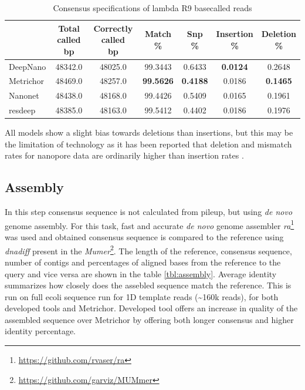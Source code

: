 \documentclass[times, utf8, diplomski, numeric, english]{fer}
\begin{document}
\begin{table}[htb]
	\caption{Consensus specifications of lambda R9 basecalled reads}
	\label{tbl:spec_lambda}
	\centering
	
	\begin{tabular}{lcccccc}
		\toprule
		{} &  \thead{Total called\\\lbrack bp\rbrack} &  \thead{Correctly called\\\lbrack bp\rbrack} &  \thead{Match\\\%} &  \thead{Snp\\\%} &  \thead{Insertion\\\%} &  \thead{Deletion\\\%} \\
		\midrule
		DeepNano  &                    48342.0 &                        48025.0 &          99.3443 &         0.6433 &               \textbf{0.0124} &              0.2648 \\
		Metrichor &                    48469.0 &                        48257.0 &          \textbf{99.5626} &         \textbf{0.4188} &               0.0186 &              \textbf{0.1465} \\
		Nanonet   &                    48438.0 &                        48168.0 &          99.4426 &         0.5409 &               0.0165 &              0.1961 \\
		resdeep   &                    48385.0 &                        48163.0 &          99.5412 &         0.4402 &               0.0186 &              0.1976 \\
		\bottomrule
	\end{tabular}
\end{table}

All models show a slight bias towards deletions than insertions, but this may be the limitation of technology as it has been reported that deletion and mismatch rates for nanopore data are ordinarily higher than insertion rates \cite{sovic}.

\subsection{Assembly}
In this step consensus sequence is not calculated from pileup, but using \textit{de novo} genome assembly. For this task, fast and accurate \textit{de novo} genome assembler \textit{ra}\footnote{\url{https://github.com/rvaser/ra}} \cite{vaser} was used and obtained consensus sequence is compared to the reference using \textit{dnadiff} present in the \textit{Mumer}\footnote{\url{https://github.com/garviz/MUMmer}}. 
The length of the reference, consensus sequence, number of contigs and percentages of aligned bases from the reference to the query and vice versa are shown in the table \ref{tbl:assembly}. Average identity summarizes how closely does the assebled sequence match the reference. This is run on full ecoli sequence run for 1D template reads (\textasciitilde 160k reads), for both developed tools and Metrichor. Developed tool offers an increase in quality of the assembled sequence over Metrichor by offering both longer consensus and higher identity percentage.
\end{document}
